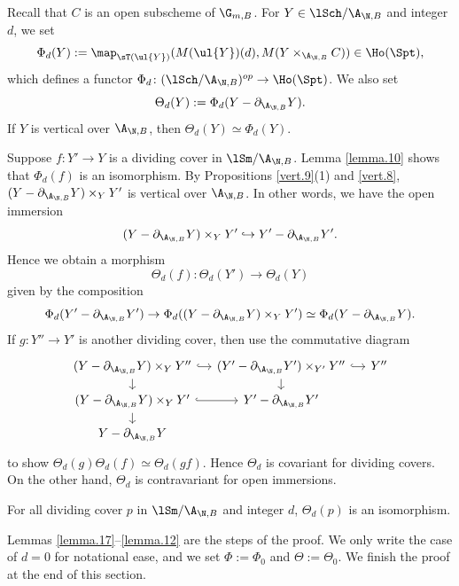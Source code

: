 \documentclass[10pt]{amsart}
\begin{document}
\begin{const}
\label{lemma.11}
Recall that $C$ is an open subscheme of $\G_{m,B}$.
For $Y\in \lSch/\A_{\N,B}$ and integer $d$, we set
\[
\Phi_d(Y)
:=
\map_{\sT(\ul{Y})}
(M(\ul{Y})(d),M(Y\times_{\A_{\N,B}}C))
\in
\Ho(\Spt),
\]
which defines a functor $\Phi_d \colon (\lSch/\A_{\N,B})^{op}\to \Ho(\Spt)$.
We also set
\[
\Theta_d(Y)
:=
\Phi_d(Y-\partial_{\A_{\N,B}}Y).
\]
If $Y$ is vertical over $\A_{\N,B}$, then $\Theta_d(Y)\simeq \Phi_d(Y)$.

Suppose $f\colon Y'\to Y$ is a dividing cover in $\lSm/\A_{\N,B}$.
Lemma \ref{lemma.10} shows that $\Phi_d(f)$ is an isomorphism.
By Propositions \ref{vert.9}(1) and \ref{vert.8}, $(Y-\partial_{\A_{\N,B}}Y)\times_Y Y'$ is vertical over $\A_{\N,B}$.
In other words, we have the open immersion
\begin{equation}
\label{lemma.11.1}
(Y-\partial_{\A_{\N,B}}Y)\times_Y Y'
\hookrightarrow
Y'-\partial_{\A_{\N,B}} Y'.
\end{equation}
Hence we obtain a morphism
\begin{equation}
\label{lemma.11.2}
\Theta_d(f)\colon \Theta_d(Y')\to \Theta_d(Y)
\end{equation}
given by the composition
\[
\Phi_d(Y'-\partial_{\A_{\N,B}}Y')
\to 
\Phi_d((Y-\partial_{\A_{\N,B}}Y)\times_Y Y')
\simeq 
\Phi_d(Y-\partial_{\A_{\N,B}}Y).
\]
If $g\colon Y''\to Y'$ is another dividing cover, then use the commutative diagram
\[
\begin{tikzcd}[column sep=small, row sep=small]
(Y-\partial_{\A_{\N,B}}Y)\times_Y Y''\ar[r,hookrightarrow]\ar[d]&
(Y'-\partial_{\A_{\N,B}} Y')\times_{Y'}Y''\ar[r,hookrightarrow]\ar[d]&
Y''
\\
(Y-\partial_{\A_{\N,B}}Y)\times_Y Y'\ar[r,hookrightarrow]\ar[d]&
Y'-\partial_{\A_{\N,B}} Y'
\\
Y-\partial_{\A_{\N,B}}Y
\end{tikzcd}
\]
to show $\Theta_d(g)\Theta_d(f)\simeq \Theta_d(gf)$.
Hence $\Theta_d$ is covariant for dividing covers.
On the other hand, $\Theta_d$ is contravariant for open immersions.
\end{const}

\begin{prop}
\label{lemma.7}
For all dividing cover $p$ in $\lSm/\A_{\N,B}$ and integer $d$, $\Theta_d(p)$ is an isomorphism.
\end{prop}

Lemmas \ref{lemma.17}--\ref{lemma.12} are the steps of the proof.
We only write the case of $d=0$ for notational ease, and we set $\Phi:=\Phi_0$ and $\Theta:=\Theta_0$.
We finish the proof at the end of this section.
\end{document}
